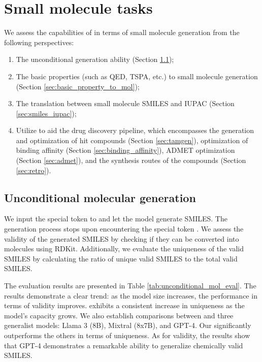 \section{Small molecule tasks}\label{sec:smallmol}
We assess the capabilities of \ourM{} in terms of small molecule generation from the following perspectives: 
\begin{enumerate}
    \item The unconditional generation ability (Section \ref{sec:smallmol_uncondition});
    \item The basic properties (such as QED, TSPA, etc.) to small molecule generation (Section \ref{sec:basic_property_to_mol});
    \item The translation between small molecule SMILES and IUPAC (Section \ref{sec:smiles_iupac}); %
    \item Utilize \ourM{} to aid the drug discovery pipeline, which encompasses the generation and optimization of hit compounds (Section \ref{sec:tamgen}), optimization of binding affinity (Section \ref{sec:binding_affinity}), ADMET optimization (Section \ref{sec:admet}), and the synthesis routes of the compounds (Section \ref{sec:retro}).
\end{enumerate}



\subsection{Unconditional molecular generation}\label{sec:smallmol_uncondition}
We input the special token \mol{} to \ourM{} and let the model generate SMILES. The generation process stops upon encountering the special token \emol{}. We assess the validity of the generated SMILES by checking if they can be converted into molecules using RDKit. Additionally, we evaluate the uniqueness of the valid SMILES by calculating the ratio of unique valid SMILES to the total valid SMILES.

The evaluation results are presented in Table \ref{tab:unconditional_mol_eval}. The results demonstrate a clear trend: as the model size increases, the performance in terms of validity improves. \ourM{} exhibits a consistent increase in uniqueness as the model's capacity grows.  We also establish comparisons between \ourM{} and three generalist models: Llama 3 (8B), Mixtral (8x7B), and GPT-4. Our \ourM{} significantly outperforms the others in terms of uniqueness. As for validity, the results show that GPT-4 demonstrates a remarkable ability to generalize chemically valid SMILES.

